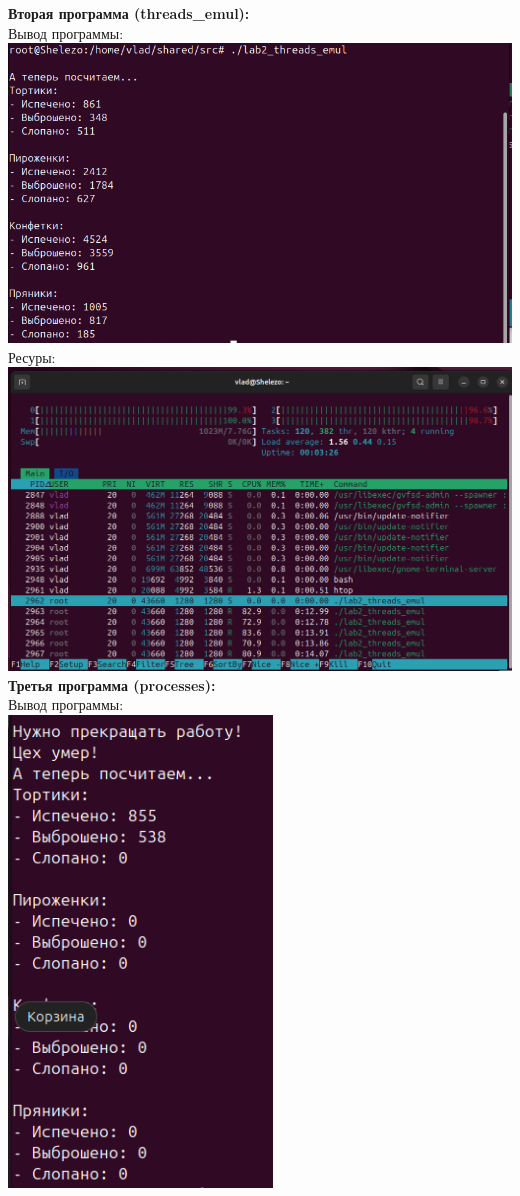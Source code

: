 \documentclass[a4paper,14pt]{extarticle}
\begin{document}
\textbf{Вторая программа (threads\_emul):}\\
Вывод программы:\\
\includegraphics[width=140mm]{threads_emul_output_4}\\
Ресуры:\\
\includegraphics[width=140mm]{threads_emul_resources_4}\\
\textbf{Третья программа (processes):}\\
Вывод программы:\\
\includegraphics[width=70mm]{processes_output_4_1}
\end{document}
